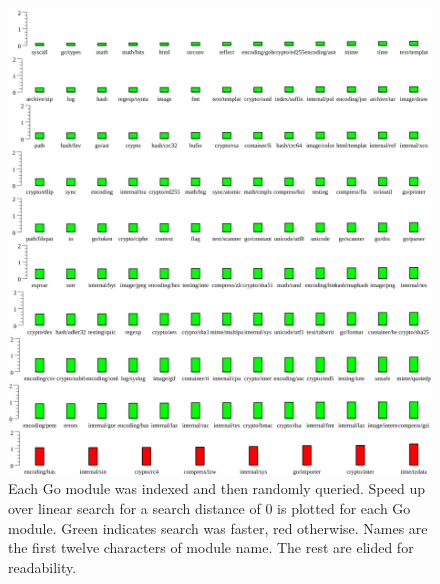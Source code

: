 \begin{figure}
    \includegraphics[width=\textwidth]{example0.png}
    \centering
    \caption{Each Go module was indexed and then randomly queried.
    Speed up over linear search for a search distance of $0$ is plotted for each Go module.
    Green indicates search was faster, red otherwise.
    Names are the first twelve characters of module name.
    The rest are elided for readability.}
    \label{dist0plot}
\end{figure}
